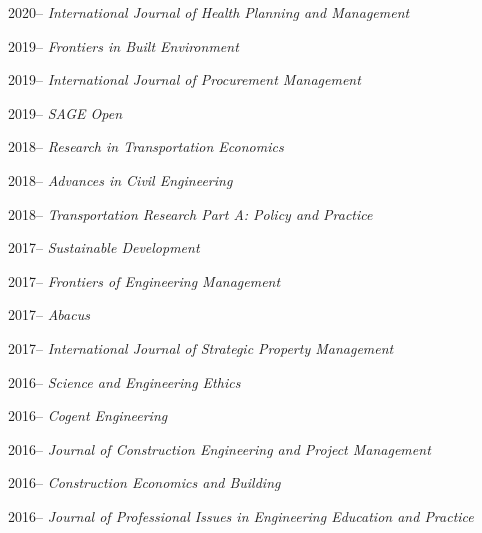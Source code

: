\documentclass[11pt,a4paper]{report} %
\begin{document}
\begin{tablist}
        \item[2020--] \tab{}\textit{International Journal of Health Planning and Management}
        
        \item[2019--] \tab{}\textit{Frontiers in Built Environment}
        
        \item[2019--] \tab{}\textit{International Journal of Procurement Management}
        
        \item[2019--] \tab{}\textit{SAGE Open}
        
        \item[2018--] \tab{}\textit{Research in Transportation Economics}
        
        \item[2018--] \tab{}\textit{Advances in Civil Engineering}
        
        \item[2018--] \tab{}\textit{Transportation Research Part A: Policy and Practice}
        
        \item[2017--] \tab{}\textit{Sustainable Development}
        
        \item[2017--] \tab{}\textit{Frontiers of Engineering Management}
        
        \item[2017--] \tab{}\textit{Abacus}
        
        \item[2017--] \tab{}\textit{International Journal of Strategic Property Management}
        
        \item[2016--] \tab{}\textit{Science and Engineering Ethics}
        
        \item[2016--] \tab{}\textit{Cogent Engineering}
        
        \item[2016--] \tab{}\textit{Journal of Construction Engineering and Project Management}
        
        \item[2016--] \tab{}\textit{Construction Economics and Building}
        
        \item[2016--] \tab{}\textit{Journal of Professional Issues in Engineering Education and Practice}
        

\end{tablist}
\end{document}
